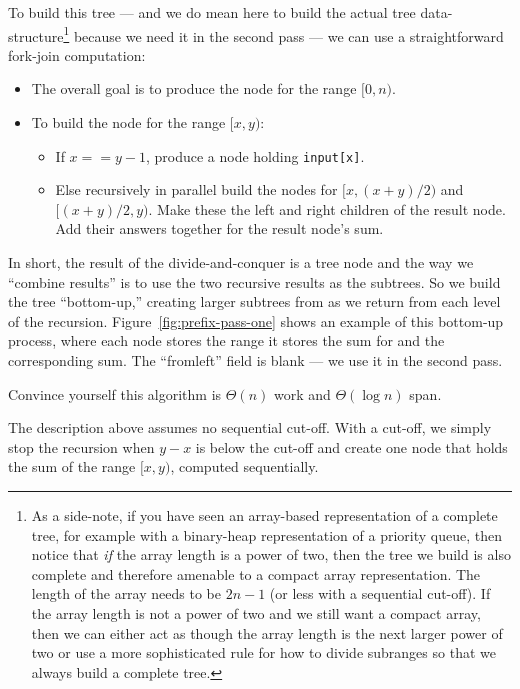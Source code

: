 \documentclass[10pt]{article}
\begin{document}
To build this tree --- and we do mean here to build the actual tree
data-structure\footnote{As a side-note, if you have seen an
  array-based representation of a complete tree, for example with a
  binary-heap representation of a priority queue, then notice that
  \emph{if} the array length is a power of two, then the tree we build
  is also complete and therefore amenable to a compact array
  representation.  The length of the array needs to be $2n-1$ (or less
  with a sequential cut-off).  If the array length is not a power of
  two and we still want a compact array, then we can either act as
  though the array length is the next larger power of two or use a more
  sophisticated rule for how to divide subranges so that we always
  build a complete tree.} because we need it in the second pass --- we
can use a straightforward fork-join computation:

\begin{itemize}
\item The overall goal is to produce the node for the range $[0,n)$.
\item To build the node for the range $[x,y)$:
  \begin{itemize}
  \item If $x==y-1$, produce a node holding {\tt input[x]}.
  \item Else recursively in parallel build the nodes for $[x,(x+y)/2)$ 
    and $[(x+y)/2,y)$.  Make these the left and right
  children of the result node.  Add their answers together for the
  result node's sum.
  \end{itemize}
\end{itemize}
In short, the result of the divide-and-conquer is a tree node and the
way we ``combine results'' is to use the two recursive results as the
subtrees.  So we build the tree ``bottom-up,'' creating larger
subtrees from as we return from each level of the recursion.
Figure~\ref{fig:prefix-pass-one} shows an example of this
bottom-up process, where each node stores the range it stores the sum
for and the corresponding sum.  The ``fromleft'' field is blank --- we
use it in the second pass.

Convince yourself this algorithm is $\Theta(n)$ work and $\Theta(\log
n)$ span.

The description above assumes no sequential cut-off.  With a cut-off,
we simply stop the recursion when $y-x$ is below the cut-off and
create one node that holds the sum of the range $[x,y)$, 
computed sequentially.
\end{document}
